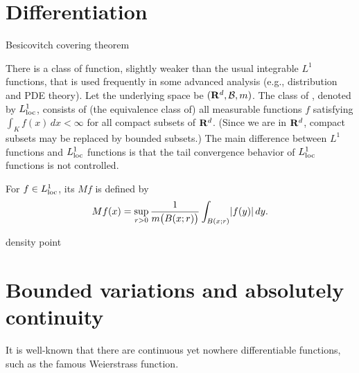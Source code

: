 \section{Differentiation}
\begin{namedthm}
    
\end{namedthm}

Besicovitch covering theorem

There is a class of function, slightly weaker than the usual integrable $L^1$ functions, that is used frequently in some advanced analysis (e.g., distribution and PDE theory). Let the underlying space be $(\mathbf{R}^d,\mathcal{B},m)$. The class of , denoted by $L^1_\mathrm{loc}$, consists of (the equivalence class of) all measurable functions $f$ satisfying $\int_K f(x)\,dx<\infty$ for all compact subsets of $\mathbf{R}^d$. (Since we are in $\mathbf{R}^d$, compact subsets may be replaced by bounded subsets.) 
The main difference between $L^1$ functions and $L^1_\mathrm{loc}$ functions is that the tail convergence behavior of $L^1_\mathrm{loc}$ functions is not controlled.

\begin{defn}
    For $f\in L^1_\mathrm{loc}$, its  $Mf$ is defined by \[
        Mf(x) = \sup_{r > 0} \frac{1}{m\bigl(B(x;r)\bigr)} \int_{B(x;r)} \lvert f(y) \rvert\,dy.
    \]
\end{defn}

\begin{namedthm}
    
\end{namedthm}

density point

\section{Bounded variations and absolutely continuity}

It is well-known that there are continuous yet nowhere differentiable functions, such as the famous Weierstrass function.

